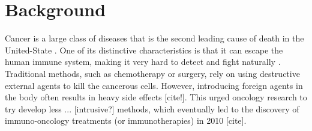 \documentclass[11pt]{article}
\begin{document}
\section{Background}\label{sec:background}

\quad Cancer is a large class of diseases that is the second leading cause of death in the United-State \cite{nchs}. One of its distinctive characteristics is that it can escape the human immune system, making it very hard to detect and fight naturally \cite{EvasionMech}. Traditional methods, such as chemotherapy or surgery, rely on using destructive external agents to kill the cancerous cells. However, introducing foreign agents in the body often results in heavy side effects [cite!]. This urged oncology research to try develop less ... [intrusive?] methods, which eventually led to the discovery of immuno-oncology treatments (or immunotherapies) in 2010 [cite]. 
\end{document}
